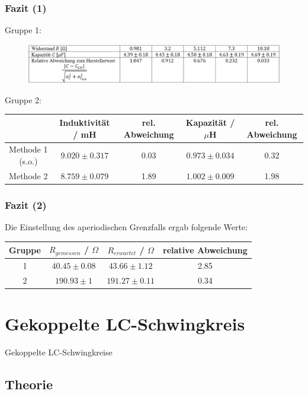 \documentclass{beamer}
\begin{document}
\begin{frame}
\frametitle{Fazit (1)}
Gruppe 1:
\begin{figure}
\includegraphics[width=\textwidth]{abbildungen/1VCWerte.PNG}
\end{figure}
Gruppe 2:
\begin{table}
\begin{adjustbox}{width = \textwidth}
\begin{tabular}{c|c|c|c|c}
& Induktivität / mH & rel. Abweichung & Kapazität / $\mu$H & rel. Abweichung \\
\hline
Methode 1 (s.o.) & $9.020 \pm 0.317$ & 0.03 & $0.973 \pm 0.034$ & 0.32 \\
Methode 2 & $8.759\pm0.079$ & 1.89 & $1.002 \pm 0.009$ & 1.98 
\end{tabular}
\end{adjustbox}
\end{table}
\end{frame}

\begin{frame}
\frametitle{Fazit (2)}
Die Einstellung des aperiodischen Grenzfalls ergab folgende Werte:
\begin{table}
\begin{tabular}{c|cc|c}
Gruppe & $R_{gemessen}$ / $\Omega$ & $R_{erwartet}$ / $\Omega$ & relative Abweichung \\
\hline
1 & $40.45 \pm 0.08$ & $43.66\pm 1.12$ & 2.85 \\
2 & $190.93 \pm 1$ & $191.27 \pm 0.11$ & 0.34
\end{tabular}
\end{table}
\end{frame}

\section{Gekoppelte LC-Schwingkreis}

\begin{frame}
\centering
\Large{Gekoppelte LC-Schwingkreise}
\end{frame}

\subsection{Theorie}
\end{document}
